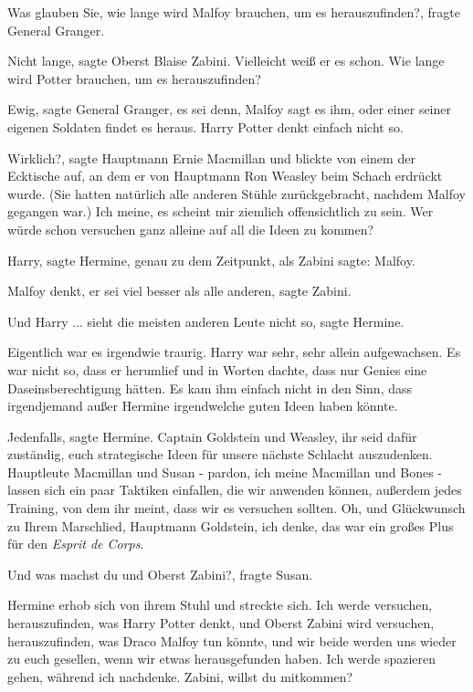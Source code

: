\glqq{}Was glauben Sie, wie lange wird Malfoy brauchen, um es
herauszufinden?\grqq{}, fragte General Granger.

\glqq{}Nicht lange\grqq{}, sagte Oberst Blaise Zabini. \glqq{}Vielleicht weiß er
es schon. Wie lange wird Potter brauchen, um es herauszufinden?\grqq{}

\glqq{}Ewig\grqq{}, sagte General Granger, \glqq{}es sei denn, Malfoy sagt es
ihm, oder einer seiner eigenen Soldaten findet es heraus. Harry Potter denkt
einfach nicht so.\grqq{}

\glqq{}Wirklich?\grqq{}, sagte Hauptmann Ernie Macmillan und blickte von einem
der Ecktische auf, an dem er von Hauptmann Ron Weasley beim Schach erdrückt
wurde. (Sie hatten natürlich alle anderen Stühle zurückgebracht, nachdem Malfoy
gegangen war.) \glqq{}Ich meine, es scheint mir ziemlich offensichtlich zu sein.
Wer würde schon versuchen ganz alleine auf all die Ideen zu kommen?\grqq{}

\glqq{}Harry\grqq{}, sagte Hermine, genau zu dem Zeitpunkt, als Zabini sagte:
\glqq{}Malfoy.\grqq{}

\glqq{}Malfoy denkt, er sei viel besser als alle anderen\grqq{}, sagte Zabini.

\glqq{}Und Harry ... sieht die meisten anderen Leute nicht so\grqq{}, sagte
Hermine.

Eigentlich war es irgendwie traurig. Harry war sehr, sehr allein aufgewachsen.
Es war nicht so, dass er herumlief und in Worten dachte, dass nur Genies eine
Daseinsberechtigung hätten. Es kam ihm einfach nicht in den Sinn, dass
irgendjemand außer Hermine irgendwelche guten Ideen haben könnte.

\glqq{}Jedenfalls\grqq{}, sagte Hermine. \glqq{}Captain Goldstein und Weasley,
ihr seid dafür zuständig, euch strategische Ideen für unsere nächste Schlacht
auszudenken. Hauptleute Macmillan und Susan - pardon, ich meine Macmillan und
Bones - lassen sich ein paar Taktiken einfallen, die wir anwenden können,
außerdem jedes Training, von dem ihr meint, dass wir es versuchen sollten. Oh,
und Glückwunsch zu Ihrem Marschlied, Hauptmann Goldstein, ich denke, das war ein
großes Plus für den \emph{Esprit de Corps}.\grqq{}

\glqq{}Und was machst du und Oberst Zabini?\grqq{}, fragte Susan.

Hermine erhob sich von ihrem Stuhl und streckte sich. \glqq{}Ich werde
versuchen, herauszufinden, was Harry Potter denkt, und Oberst Zabini wird
versuchen, herauszufinden, was Draco Malfoy tun könnte, und wir beide werden uns
wieder zu euch gesellen, wenn wir etwas herausgefunden haben. Ich werde
spazieren gehen, während ich nachdenke. Zabini, willst du mitkommen?\grqq{}

